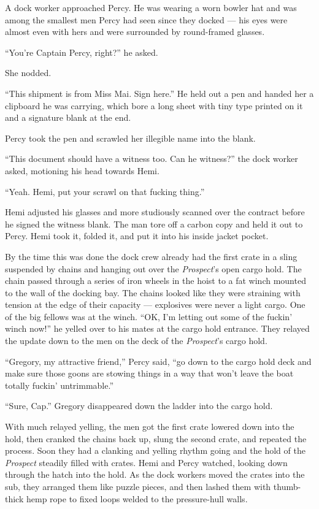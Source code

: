 \documentclass[
]{scrbook}
\begin{document}
A dock worker approached Percy. He was wearing a worn bowler hat and was
among the smallest men Percy had seen since they docked --- his eyes
were almost even with hers and were surrounded by round-framed glasses.

``You're Captain Percy, right?'' he asked.

She nodded.

``This shipment is from Miss Mai. Sign here.'' He held out a pen and
handed her a clipboard he was carrying, which bore a long sheet with
tiny type printed on it and a signature blank at the end.

Percy took the pen and scrawled her illegible name into the blank.

``This document should have a witness too. Can he witness?'' the dock
worker asked, motioning his head towards Hemi.

``Yeah. Hemi, put your scrawl on that fucking thing.''

Hemi adjusted his glasses and more studiously scanned over the contract
before he signed the witness blank. The man tore off a carbon copy and
held it out to Percy. Hemi took it, folded it, and put it into his
inside jacket pocket.

By the time this was done the dock crew already had the first crate in a
sling suspended by chains and hanging out over the \emph{Prospect}'s
open cargo hold. The chain passed through a series of iron wheels in the
hoist to a fat winch mounted to the wall of the docking bay. The chains
looked like they were straining with tension at the edge of their
capacity --- explosives were never a light cargo. One of the big fellows
was at the winch. ``OK, I'm letting out some of the fuckin' winch now!''
he yelled over to his mates at the cargo hold entrance. They relayed the
update down to the men on the deck of the \emph{Prospect}'s cargo hold.

``Gregory, my attractive friend,'' Percy said, ``go down to the cargo
hold deck and make sure those goons are stowing things in a way that
won't leave the boat totally fuckin' untrimmable.''

``Sure, Cap.'' Gregory disappeared down the ladder into the cargo hold.

With much relayed yelling, the men got the first crate lowered down into
the hold, then cranked the chains back up, slung the second crate, and
repeated the process. Soon they had a clanking and yelling rhythm going
and the hold of the \emph{Prospect} steadily filled with crates. Hemi
and Percy watched, looking down through the hatch into the hold. As the
dock workers moved the crates into the sub, they arranged them like
puzzle pieces, and then lashed them with thumb-thick hemp rope to fixed
loops welded to the pressure-hull walls.
\end{document}
